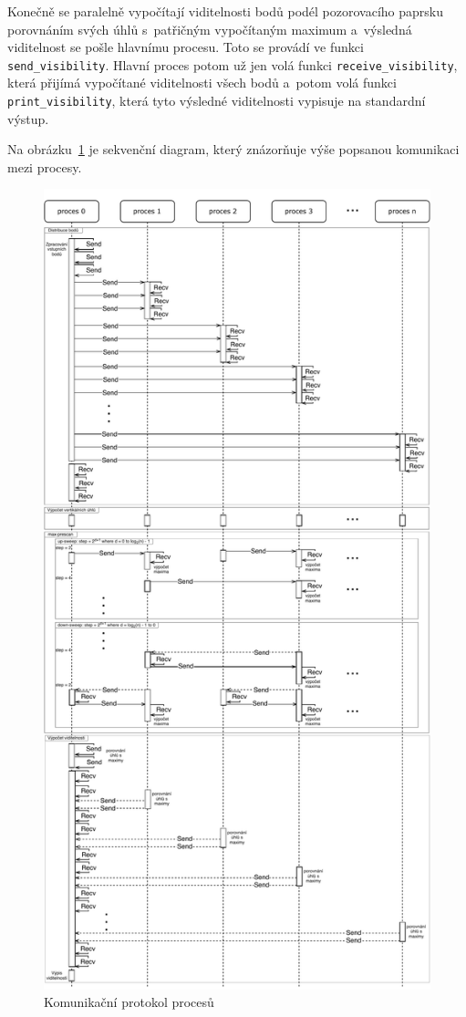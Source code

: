 \documentclass[a4paper, 10pt, twocolumn]{article}
\begin{document}
    Konečně se paralelně vypočítají viditelnosti bodů podél pozorovacího
    paprsku porovnáním svých úhlů s~patřičným vypočítaným maximum
    a~výsledná viditelnost se pošle hlavnímu procesu. Toto se provádí
    ve funkci \texttt{send\_visibility}. Hlavní proces potom už jen volá
    funkci \texttt{receive\_visibility}, která přijímá vypočítané
    viditelnosti všech bodů a~potom volá funkci \texttt{print\_visibility},
    která tyto výsledné viditelnosti vypisuje na standardní výstup.

    Na obrázku~\ref{fig:seq-diagram} je sekvenční diagram, který znázorňuje
    výše popsanou komunikaci mezi procesy.

    \begin{figure}[ht]
        \centering
        \includegraphics[width=.95 \linewidth]{img/sequence-diagram.pdf}
        \caption{Komunikační protokol procesů}
        \label{fig:seq-diagram}
    \end{figure}
\end{document}
